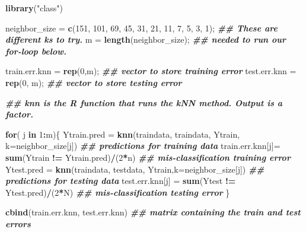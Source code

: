 \documentclass[
]{book}
\newenvironment{Shaded}{\begin{snugshade}}{\end{snugshade}}
\newcommand{\AttributeTok}[1]{\textcolor[rgb]{0.13,0.29,0.53}{#1}}
\newcommand{\ControlFlowTok}[1]{\textcolor[rgb]{0.13,0.29,0.53}{\textbf{#1}}}
\newcommand{\DecValTok}[1]{\textcolor[rgb]{0.00,0.00,0.81}{#1}}
\newcommand{\DocumentationTok}[1]{\textcolor[rgb]{0.56,0.35,0.01}{\textbf{\textit{#1}}}}
\newcommand{\FunctionTok}[1]{\textcolor[rgb]{0.13,0.29,0.53}{\textbf{#1}}}
\newcommand{\NormalTok}[1]{#1}
\newcommand{\OtherTok}[1]{\textcolor[rgb]{0.56,0.35,0.01}{#1}}
\newcommand{\SpecialCharTok}[1]{\textcolor[rgb]{0.81,0.36,0.00}{\textbf{#1}}}
\newcommand{\StringTok}[1]{\textcolor[rgb]{0.31,0.60,0.02}{#1}}
\begin{document}
\begin{Shaded}
\begin{Highlighting}[]
\FunctionTok{library}\NormalTok{(}\StringTok{"class"}\NormalTok{) }

\NormalTok{neighbor\_size }\OtherTok{=} \FunctionTok{c}\NormalTok{(}\DecValTok{151}\NormalTok{, }\DecValTok{101}\NormalTok{, }\DecValTok{69}\NormalTok{,  }\DecValTok{45}\NormalTok{, }\DecValTok{31}\NormalTok{, }\DecValTok{21}\NormalTok{, }\DecValTok{11}\NormalTok{, }\DecValTok{7}\NormalTok{, }\DecValTok{5}\NormalTok{, }\DecValTok{3}\NormalTok{, }\DecValTok{1}\NormalTok{); }\DocumentationTok{\#\# These are different k\textquotesingle{}s to try.}
\NormalTok{m }\OtherTok{=} \FunctionTok{length}\NormalTok{(neighbor\_size);  }\DocumentationTok{\#\# needed to run our for{-}loop below.}

\NormalTok{train.err.knn }\OtherTok{=} \FunctionTok{rep}\NormalTok{(}\DecValTok{0}\NormalTok{,m);   }\DocumentationTok{\#\# vector to store training error}
\NormalTok{test.err.knn }\OtherTok{=} \FunctionTok{rep}\NormalTok{(}\DecValTok{0}\NormalTok{, m);   }\DocumentationTok{\#\# vector to store testing error}

\DocumentationTok{\#\# knn is the R function that runs the kNN method. Output is a factor.}

\ControlFlowTok{for}\NormalTok{( j }\ControlFlowTok{in} \DecValTok{1}\SpecialCharTok{:}\NormalTok{m)\{}
\NormalTok{  Ytrain.pred }\OtherTok{=} \FunctionTok{knn}\NormalTok{(traindata, traindata, Ytrain, }\AttributeTok{k=}\NormalTok{neighbor\_size[j])   }\DocumentationTok{\#\# predictions for training data}
\NormalTok{  train.err.knn[j]}\OtherTok{=} \FunctionTok{sum}\NormalTok{(Ytrain }\SpecialCharTok{!=}\NormalTok{ Ytrain.pred)}\SpecialCharTok{/}\NormalTok{(}\DecValTok{2}\SpecialCharTok{*}\NormalTok{n)     }\DocumentationTok{\#\# mis{-}classification training error}
\NormalTok{  Ytest.pred }\OtherTok{=} \FunctionTok{knn}\NormalTok{(traindata, testdata, Ytrain,}\AttributeTok{k=}\NormalTok{neighbor\_size[j])      }\DocumentationTok{\#\# predictions for testing data}
\NormalTok{  test.err.knn[j] }\OtherTok{=} \FunctionTok{sum}\NormalTok{(Ytest }\SpecialCharTok{!=}\NormalTok{ Ytest.pred)}\SpecialCharTok{/}\NormalTok{(}\DecValTok{2}\SpecialCharTok{*}\NormalTok{N)       }\DocumentationTok{\#\# mis{-}classification testing error}
\NormalTok{\}}

\FunctionTok{cbind}\NormalTok{(train.err.knn, test.err.knn)    }\DocumentationTok{\#\# matrix containing the train and test errors}
\end{Highlighting}
\end{Shaded}
\end{document}
